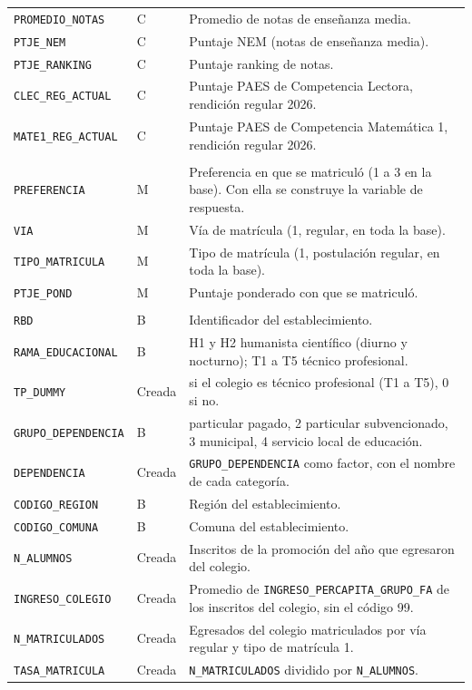 \documentclass[11pt,letterpaper]{article}
\begin{document}
\begin{longtable}{>{\raggedright\arraybackslash}p{5.4cm}
                  >{\raggedright\arraybackslash}p{1.4cm}
                  >{\raggedright\arraybackslash}p{6.6cm}}
\texttt{PROMEDIO\_NOTAS} & C & Promedio de notas de enseñanza media. \\
\texttt{PTJE\_NEM} & C & Puntaje NEM (notas de enseñanza media). \\
\texttt{PTJE\_RANKING} & C & Puntaje ranking de notas. \\
\texttt{CLEC\_REG\_ACTUAL} & C & Puntaje PAES de Competencia Lectora, rendición regular 2026. \\
\texttt{MATE1\_REG\_ACTUAL} & C & Puntaje PAES de Competencia Matemática 1, rendición regular 2026. \\
\midrule
\multicolumn{3}{l}{\textit{Matrícula}} \\
\texttt{PREFERENCIA} & M & Preferencia en que se matriculó (1 a 3 en la base). Con ella se construye la variable de respuesta. \\
\texttt{VIA} & M & Vía de matrícula (1, regular, en toda la base). \\
\texttt{TIPO\_MATRICULA} & M & Tipo de matrícula (1, postulación regular, en toda la base). \\
\texttt{PTJE\_POND} & M & Puntaje ponderado con que se matriculó. \\
\midrule
\multicolumn{3}{l}{\textit{Colegio de egreso}} \\
\texttt{RBD} & B & Identificador del establecimiento. \\
\texttt{RAMA\_EDUCACIONAL} & B & H1 y H2 humanista científico (diurno y nocturno); T1 a T5 técnico profesional. \\
\texttt{TP\_DUMMY} & Creada & 1 si el colegio es técnico profesional (T1 a T5), 0 si no. \\
\texttt{GRUPO\_DEPENDENCIA} & B & 1 particular pagado, 2 particular subvencionado, 3 municipal, 4 servicio local de educación. \\
\texttt{DEPENDENCIA} & Creada & \texttt{GRUPO\_DEPENDENCIA} como factor, con el nombre de cada categoría. \\
\texttt{CODIGO\_REGION} & B & Región del establecimiento. \\
\texttt{CODIGO\_COMUNA} & B & Comuna del establecimiento. \\
\texttt{N\_ALUMNOS} & Creada & Inscritos de la promoción del año que egresaron del colegio. \\
\texttt{INGRESO\_COLEGIO} & Creada & Promedio de \texttt{INGRESO\_PERCAPITA\_GRUPO\_FA} de los inscritos del colegio, sin el código 99. \\
\texttt{N\_MATRICULADOS} & Creada & Egresados del colegio matriculados por vía regular y tipo de matrícula 1. \\
\texttt{TASA\_MATRICULA} & Creada & \texttt{N\_MATRICULADOS} dividido por \texttt{N\_ALUMNOS}. \\
\end{longtable}
\end{document}
